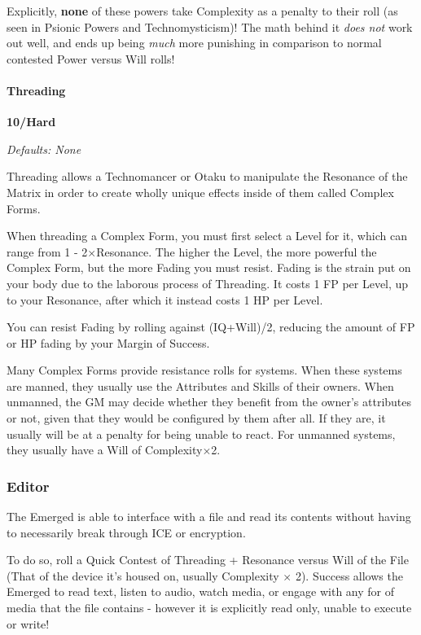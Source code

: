 \begin{multicols*}{3}
	Explicitly, \textbf{none} of these powers take Complexity as a penalty to their roll (as seen in Psionic Powers and Technomysticism)! The math behind it \textit{does not} work out well, and ends up being \textit{much} more punishing in comparison to normal contested Power versus Will rolls!
	
	\paragraph{Threading}\label{threading}
	\begin{flushright}
		\textbf{10/Hard}
	\end{flushright}
	\textcolor{NavyBlue}{\textit{Defaults: None}}
	
	Threading allows a Technomancer or Otaku to manipulate the Resonance of the Matrix in order to create wholly unique effects inside of them called Complex Forms.
	
	When threading a Complex Form, you must first select a Level for it, which can range from 1 - 2\(\times\)Resonance. The higher the Level, the more powerful the Complex Form, but the more Fading you must resist. Fading is the strain put on your body due to the laborous process of Threading. It costs 1 FP per Level, up to your Resonance, after which it instead costs 1 HP per Level.
	
	You can resist Fading by rolling against (IQ+Will)/2, reducing the amount of FP or HP fading by your Margin of Success.
	
	Many Complex Forms provide resistance rolls for systems. When these systems are manned, they usually use the Attributes and Skills of their owners. When unmanned, the GM may decide whether they benefit from the owner's attributes or not, given that they would be configured by them after all. If they are, it usually will be at a penalty for being unable to react. For unmanned systems, they usually have a Will of Complexity\(\times\)2.
	
	\subsubsection*{Editor}\label{editor}
	
	The Emerged is able to interface with a file and read its contents without having to necessarily break through ICE or encryption.
	
	To do so, roll a Quick Contest of Threading + Resonance versus Will of the File (That of the device it's housed on, usually Complexity $\times$ 2). Success allows the Emerged to read text, listen to audio, watch media, or engage with any for of media that the file contains - however it is explicitly read only, unable to execute or write!
	

\end{multicols*}

